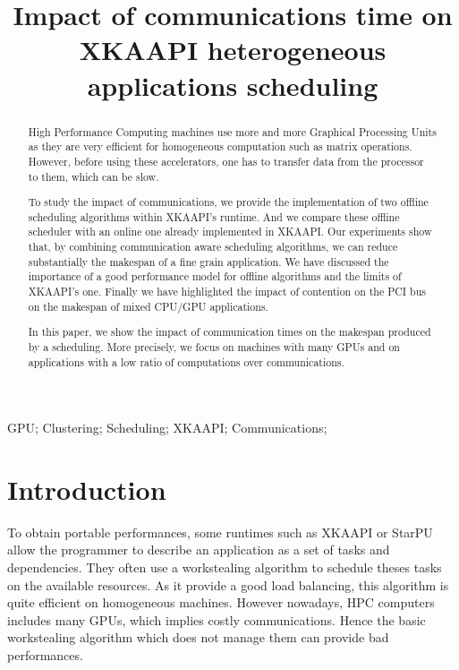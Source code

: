 \documentclass[10pt, conference, compsocconf,pdftex,dvipsnames]{IEEEtran}
\author{\IEEEauthorblockN{David Beniamine, Guillaume Huard}
    \IEEEauthorblockA{
        Université Joseph Fourier\\
        Laboratoire d'Informatique de Grenoble - Inria\\
        38330 Montbonnot St Martin, France\\
    david.beniamine@imag.fr, guillaume.huard@imag.fr}
}
\title{Impact of communications time on XKAAPI heterogeneous applications
scheduling}
\begin{document}


\maketitle%
\begin{abstract}
    High Performance Computing machines use more and more Graphical Processing
    Units as they are very efficient for homogeneous computation such as
    matrix operations. However, before using these accelerators, one has to
    transfer data from the processor to them, which can be slow. 

    To study the impact of communications, we  provide the implementation of
    two offline scheduling algorithms within  XKAAPI's runtime. And we
    compare these offline scheduler with an online one already implemented in
    XKAAPI. Our experiments show that, by combining communication aware
    scheduling algorithms, we can reduce substantially the makespan of a fine
    grain application. We have discussed the importance of a good performance
    model for offline algorithms and the limits of XKAAPI's one. Finally we
    have highlighted the impact of
    contention on the PCI bus on the makespan of mixed CPU/GPU applications. 

    In this paper, we show the impact of communication times on the
    makespan produced by a scheduling.  More precisely, we focus on machines
    with many GPUs and on applications with a low ratio of computations over
    communications. 


\end{abstract}

\begin{IEEEkeywords}
    GPU; Clustering; Scheduling; XKAAPI; Communications;

\end{IEEEkeywords}




\section{Introduction}

To obtain portable performances, some runtimes such as XKAAPI
\cite{gautierxkaapi} or StarPU \cite{augonnet2011starpu} allow the programmer
to describe an application as a set of tasks and dependencies.  They often use
a workstealing algorithm \cite{blumofe1995cilk} to schedule theses tasks on
the available resources. As it provide a good load balancing, this algorithm
is quite efficient on homogeneous machines. However nowadays, HPC computers
includes many GPUs, which implies  costly communications. Hence the basic
workstealing algorithm which does not manage them can provide bad performances.
\end{document}

